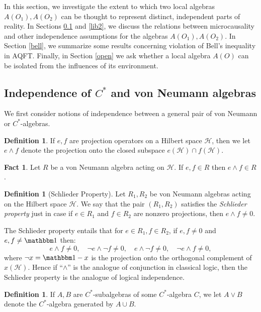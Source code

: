 \documentclass[12pt]{article}
\theoremstyle{definition}
\newtheorem{fact}[thm]{Fact}
\theoremstyle{definition}
\newtheorem{defn}[thm]{Definition}
\theoremstyle{remark}
\def\2#1{{\mathcal #1}}
\def\8#1{{\mathbbm #1}}
\begin{document}
In this section, we investigate the extent to which two local algebras
$A(O_1),A(O_2)$ can be thought to represent distinct, independent
parts of reality.  In Sections \ref{liberty} and \ref{lib2}, we
discuss the relations between microcausality and other independence
assumptions for the algebras $A(O_1),A(O_2)$.  In Section \ref{bell},
we summarize some results concerning violation of Bell's inequality in
AQFT.  Finally, in Section \ref{open} we ask whether a local algebra
$A(O)$ can be isolated from the influences of its environment.

\subsection{Independence of $C^*$ and von Neumann algebras}
\label{liberty}

We first consider notions of independence between a general pair of
von Neumann or $C^*$-algebras.

\begin{defn} If $e,f$ are projection operators on a Hilbert space
  $\2H$, then we let $e\wedge f$ denote the projection onto the closed
  subspace $e(\2H )\cap f(\2H )$.  \end{defn}

\begin{fact} Let $R$ be a von Neumann algebra acting on $\2H$.  If
  $e,f\in R$ then $e\wedge f\in R$.  \end{fact}

\begin{defn}[Schlieder Property] Let $R_1,R_2$ be von Neumann algebras
  acting on the Hilbert space $\2H$.  We say that the pair $(R_1,R_2)$
  satisfies the \emph{Schlieder property} just in case if $e\in R_1$
  and $f\in R_2$ are nonzero projections, then $e\wedge f\neq 0$.
\end{defn}

\noindent The Schlieder property entails that for $e\in R_1 ,f\in
R_2$, if $e,f\neq 0$ and $e,f\neq \81$ then:
$$ e\wedge f\neq 0,\quad \neg e\wedge \neg f \neq 0,\quad e\wedge \neg
f\neq 0, \quad \neg e \wedge f\neq 0 ,$$ where $\neg x=\81 -x$ is the
projection onto the orthogonal complement of $x(\2H )$.  Hence if
``$\wedge$'' is the analogue of conjunction in classical logic, then
the Schlieder property is the analogue of logical independence.

\begin{defn} If $A,B$ are $C^*$-subalgebras of some $C^*$-algebra $C$,
  we let $A\vee B$ denote the $C^*$-algebra generated by $A\cup B$.
\end{defn}
\end{document}

